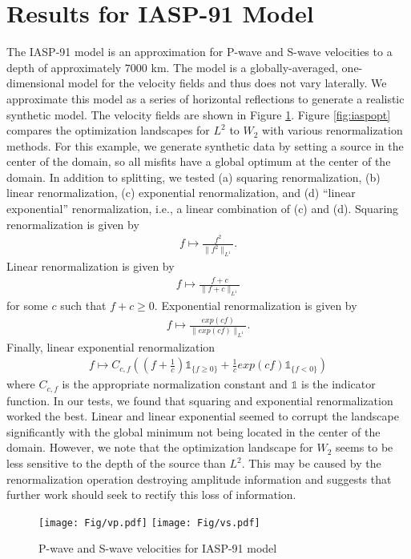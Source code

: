\documentclass[paper,onecolumn,twoside]{geophysics}
\begin{document}
\section{Results for IASP-91 Model}
The IASP-91 model is an approximation for P-wave and S-wave velocities to a depth of approximately $7000$ km. The model is a globally-averaged, one-dimensional model for the velocity fields and thus does not vary laterally. We approximate this model as a series of horizontal reflections to generate a realistic synthetic model. The velocity fields are shown in Figure \ref{fig:iaspvel}. Figure \ref{fig:iaspopt} compares the optimization landscapes for $L^2$ to $W_2$ with various renormalization methods. For this example, we generate synthetic data by setting a source in the center of the domain, so all misfits have a global optimum at the center of the domain. In addition to splitting, we tested (a) squaring renormalization, (b) linear renormalization, (c) exponential renormalization, and (d) ``linear exponential'' renormalization, i.e., a linear combination of (c) and (d). Squaring renormalization is given by
\begin{align} \label{eqn:square}
f \mapsto \frac{f^2}{\|f^2\|_{L^1}}.
\end{align}
Linear renormalization is given by
\begin{align} \label{eqn:linear}
f \mapsto \frac{f+c}{\|f+c\|_{L^1}}
\end{align}
for some $c$ such that $f + c \geq 0$.
Exponential renormalization is given by
\begin{align} \label{eqn:exponential}
f \mapsto \frac{exp(c f)}{\|exp(c f)\|_{L^1}}.
\end{align}
Finally, linear exponential renormalization
\begin{align} \label{eqn:linexp}
f \mapsto C_{c,f} \left( (f+\frac{1}{c})\mathds{1}_{\{f \geq 0\}} + \frac{1}{c} exp(c f) \mathds{1}_{\{f < 0\}}\right)
\end{align}
where $C_{c,f}$ is the appropriate normalization constant and $\mathds{1}$ is the indicator function. In our tests, we found that squaring and exponential renormalization worked the best. Linear and linear exponential seemed to corrupt the landscape significantly with the global minimum not being located in the center of the domain. However, we note that the optimization landscape for $W_2$ seems to be less sensitive to the depth of the source than $L^2$. This may be caused by the renormalization operation destroying amplitude information and suggests that further work should seek to rectify this loss of information.
\begin{figure}
\texttt{[image: Fig/vp.pdf]}
\texttt{[image: Fig/vs.pdf]}
\caption{P-wave and S-wave velocities for IASP-91 model}
\label{fig:iaspvel}
\end{figure}
\end{document}
